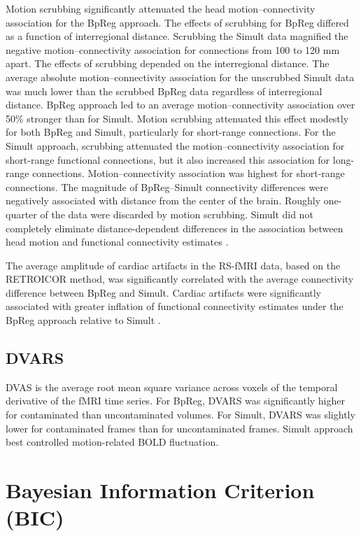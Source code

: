 \documentclass[twoside,twocolumn]{article}
\begin{document}
Motion scrubbing signiﬁcantly attenuated the head motion–connectivity association for the BpReg approach. The effects of scrubbing for BpReg differed as a function of interregional distance.  Scrubbing the Simult data magniﬁed the negative motion–connectivity association for connections from 100 to 120 mm apart.  The effects of scrubbing depended on the interregional distance.  The average absolute motion–connectivity association for the unscrubbed Simult data was much lower than the scrubbed BpReg data regardless of interregional distance. BpReg approach led to an average motion–connectivity association over 50\% stronger than for Simult. Motion scrubbing attenuated this effect modestly for both BpReg and Simult, particularly for short-range connections. For the Simult approach, scrubbing attenuated the motion–connectivity association for short-range functional connections, but it also increased this association for long-range connections.  Motion–connectivity association was highest for short-range connections.   The magnitude of BpReg–Simult connectivity differences were negatively associated with distance from the center of the brain.  Roughly one-quarter of the data were discarded by motion scrubbing.  Simult did not completely eliminate distance-dependent differences in the association between head motion and functional connectivity estimates \cite{Hallquist2013}.

The average amplitude of cardiac artifacts in the RS-fMRI data, based on the RETROICOR method\cite{Glover2000}, was signiﬁcantly correlated with the average connectivity difference between BpReg and Simult.  Cardiac artifacts were signiﬁcantly associated with greater inﬂation of functional connectivity estimates under the BpReg approach relative to Simult \cite{Hallquist2013}.

\subsection{DVARS}

DVAS is the average root mean square variance across voxels of the temporal derivative of the fMRI time series\cite{Power2012}.  For BpReg, DVARS was significantly higher for contaminated than uncontaminated volumes\cite{Hallquist2013}.  For Simult, DVARS was slightly lower for contaminated frames than for uncontaminated frames.  Simult approach best controlled motion-related BOLD fluctuation.

\section{Bayesian Information Criterion (BIC)}
\end{document}

